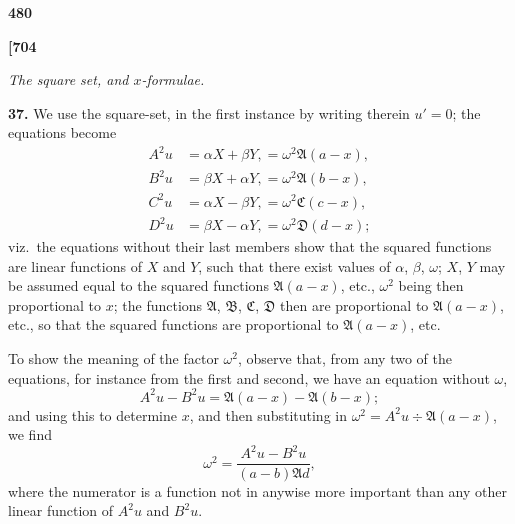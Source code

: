 \documentclass[11pt,a4paper]{book}
\begin{document}
\vspace{1em}

\begin{center}
\textbf{480}
\end{center}

\vspace{0.5em}

\noindent\textbf{[704}

\vspace{0.5em}

\begin{center}
\textit{The square set, and $x$-formulae.}
\end{center}

\vspace{0.5em}

\noindent\textbf{37.}\quad
We use the square-set, in the first instance by writing therein $u' = 0$; the equations become
\begin{align*}
A^2 u &= \alpha X + \beta Y, = \omega^2 \mathfrak{A}(a - x), \\
B^2 u &= \beta X + \alpha Y, = \omega^2 \mathfrak{A}(b - x), \\
C^2 u &= \alpha X - \beta Y, = \omega^2 \mathfrak{C}(c - x), \\
D^2 u &= \beta X - \alpha Y, = \omega^2 \mathfrak{D}(d - x);
\end{align*}
viz.\ the equations without their last members show that the squared functions are linear functions of $X$ and $Y$, such that there exist values of $\alpha$, $\beta$, $\omega$; $X$, $Y$ may be assumed equal to the squared functions $\mathfrak{A}(a - x)$, etc., $\omega^2$ being then proportional to $x$; the functions $\mathfrak{A}$, $\mathfrak{B}$, $\mathfrak{C}$, $\mathfrak{D}$ then are proportional to $\mathfrak{A}(a - x)$, etc., so that the squared functions are proportional to $\mathfrak{A}(a - x)$, etc.

To show the meaning of the factor $\omega^2$, observe that, from any two of the equations, for instance from the first and second, we have an equation without $\omega$,
\[
A^2 u - B^2 u = \mathfrak{A}(a - x) - \mathfrak{A}(b - x);
\]
and using this to determine $x$, and then substituting in $\omega^2 = A^2 u \div \mathfrak{A}(a - x)$, we find
\[
\omega^2 = \frac{A^2 u - B^2 u}{(a - b)\mathfrak{A}d},
\]
where the numerator is a function not in anywise more important than any other linear function of $A^2 u$ and $B^2 u$.

\vspace{1em}
\end{document}
